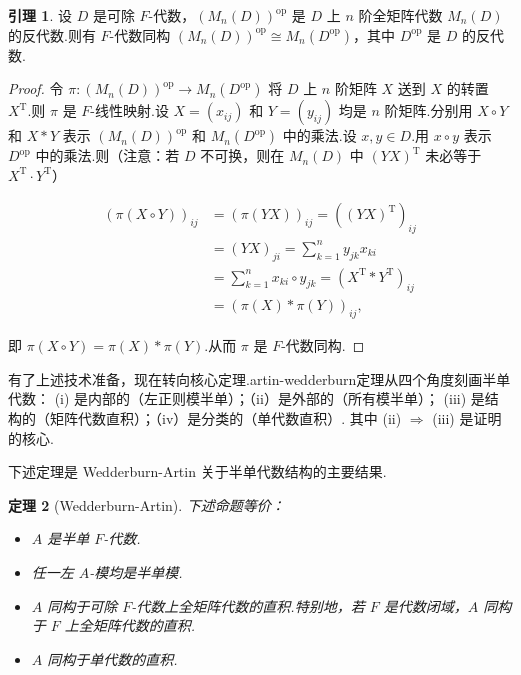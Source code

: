 \documentclass[11pt,a4paper]{article}
\theoremstyle{plain}
\newtheorem{thm}{定理}
\theoremstyle{definition}
\newtheorem{lem}[thm]{引理}
\begin{document}
\begin{lem}
设 $D$ 是可除 $F$-代数，$(M_n(D))^{\mathrm{op}}$ 是 $D$ 上 $n$ 阶全矩阵代数 $M_n(D)$ 的反代数.则有 $F$-代数同构 $(M_n(D))^{\mathrm{op}} \cong M_n(D^{\mathrm{op}})$，其中 $D^{\mathrm{op}}$ 是 $D$ 的反代数.
\end{lem}



\begin{proof}
令 $\pi : (M_n(D))^{\mathrm{op}} \to M_n(D^{\mathrm{op}})$ 将 $D$ 上 $n$ 阶矩阵 $X$ 送到 $X$ 的转置 $X^{\mathrm{T}}$.则 $\pi$ 是 $F$-线性映射.设 $X=(x_{ij})$ 和 $Y=(y_{ij})$ 均是 $n$ 阶矩阵.分别用 $X \circ Y$ 和 $X * Y$ 表示 $(M_n(D))^{\mathrm{op}}$ 和 $M_n(D^{\mathrm{op}})$ 中的乘法.设 $x, y \in D$.用 $x \circ y$ 表示 $D^{\mathrm{op}}$ 中的乘法.则（注意：若 $D$ 不可换，则在 $M_n(D)$ 中 $(YX)^{\mathrm{T}}$ 未必等于 $X^{\mathrm{T}} \cdot Y^{\mathrm{T}}$）

$$
\begin{aligned}
(\pi(X \circ Y))_{ij} &= (\pi(YX))_{ij} = ((YX)^{\mathrm{T}})_{ij} \\
&= (YX)_{ji} = \sum_{k=1}^n y_{jk} x_{ki} \\
&= \sum_{k=1}^n x_{ki} \circ y_{jk} = (X^{\mathrm{T}} * Y^{\mathrm{T}})_{ij} \\
&= (\pi(X) * \pi(Y))_{ij},
\end{aligned}
$$

即 $\pi(X \circ Y) = \pi(X) * \pi(Y)$.从而 $\pi$ 是 $F$-代数同构.
\end{proof}

\medskip
有了上述技术准备，现在转向核心定理.artin-wedderburn定理从四个角度刻画半单代数：
(i) 是内部的（左正则模半单）；（ii）是外部的（所有模半单）；
(iii) 是结构的（矩阵代数直积）；（iv）是分类的（单代数直积）.
其中 (ii) $\Rightarrow$ (iii) 是证明的核心.

下述定理是 Wedderburn-Artin 关于半单代数结构的主要结果.

\begin{thm}[Wedderburn-Artin]
下述命题等价：
\begin{itemize}
    \item[(i)] $A$ 是半单 $F$-代数.
    \item[(ii)] 任一左 $A$-模均是半单模.
    \item[(iii)] $A$ 同构于可除 $F$-代数上全矩阵代数的直积.特别地，若 $F$ 是代数闭域，$A$ 同构于 $F$ 上全矩阵代数的直积.
    \item[(iv)] $A$ 同构于单代数的直积.
\end{itemize}
\end{thm}
\end{document}
